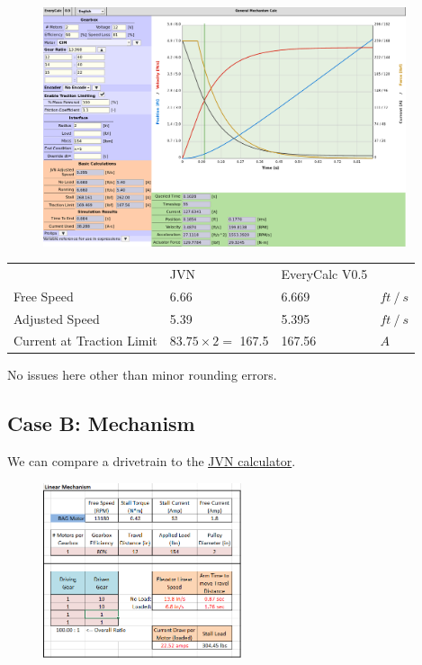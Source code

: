 \documentclass[10pt,letterpaper]{article}
\begin{document}
	\begin{figure}[H]
		\includegraphics[width=0.95\textwidth]{validation/mechanism_EC_A.png}
	\end{figure}

	\begin{table}[H]
	\begin{tabular}{llll}
	                & JVN & EveryCalc V0.5 & \\ \cline{1-4} 
	Free Speed      & 6.66 & 6.669 & $ft \ / \ s$ \\
	Adjusted Speed  & 5.39 & 5.395 & $ft \ / \ s$ \\
	Current at Traction Limit & $83.75 \times 2 =$ 167.5 & 167.56 & $A$
	\end{tabular}
	\end{table}

	No issues here other than minor rounding errors.

	\newpage
	\subsection*{Case B: Mechanism}
	We can compare a drivetrain to the \href{https://www.chiefdelphi.com/t/paper-jvns-mechanical-design-calculator-2016/146281}{\underline{JVN calculator}}.

	\begin{figure}[H]
		\includegraphics[width=0.52\textwidth]{validation/mechanism_JVN_B.png}
	\end{figure}
\end{document}
